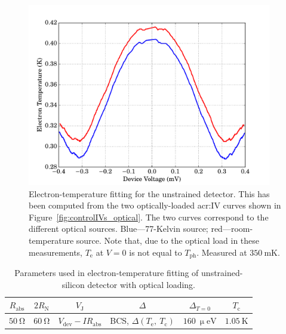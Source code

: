 \begin{figure}[tb]
\begin{center}
\includegraphics[width = 0.95\textwidth]{figures/control_Te_77_300}
\caption[Electron temperature for an optically-loaded unstrained \gls{acr:SiCEB}]{Electron-temperature fitting for the unstrained detector. This has been computed from the two optically-loaded \gls{acr:IV} curves shown in Figure~\ref{fig:controlIVs_optical}. The two curves correspond to the different optical sources. Blue---77-Kelvin source; red---room-temperature source. Note that, due to the optical load in these measurements, $T_{\mathrm{e}}$ at $V = 0$ is not equal to $T_{\mathrm{ph}}$. Measured at $350~\mathrm{mK}$.}
\label{fig:controlTe_optical}
\end{center}
\end{figure}
\begin{table}[htb]
\caption[Parameters used in electron-temperature fitting of unstrained-silicon detector with optical loading]{Parameters used in electron-temperature fitting of unstrained-silicon detector with optical loading.} 
\label{tab:ControlTeParams_optical}
\centering
\begin{tabular}{cccccc}
\toprule\toprule
$R_{\mathrm{abs}}$ & $2R_{\mathrm{N}}$ & $V_{\mathrm{J}}$ & $\varDelta$ & $\varDelta_{T=0}$ & $T_{\mathrm{c}}$ \\ \midrule
$50~\mathrm{\Omega}$ & $60~\mathrm{\Omega}$ & $V_{\mathrm{dev}} - IR_{\mathrm{abs}}$ 
& BCS, $\varDelta\left(T_{\mathrm{e}},~T_{\mathrm{c}}\right)$ & $160~\mathrm{\upmu eV}$ & $1.05~\mathrm{K}$ \\
\bottomrule
\end{tabular}
\end{table}
